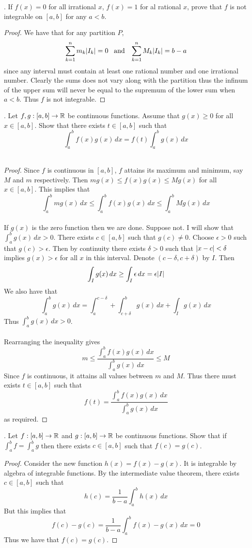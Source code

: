 \documentclass[a4paper]{article}
\begin{document}
\begin{qtn}{}{}
\thetcbcounter.\;\; If $f(x)=0$ for all irrational $x$, $f(x)=1$ for al rational $x$, prove that $f$ is not integrable on $[a,b]$ for any $a<b$. \tcbline
\begin{proof}
We have that for any partition $P$, $$\sum_{k=1}^nm_k\abs{I_k}=0\;\;\;\text{and}\;\;\;\sum_{k=1}^nM_k\abs{I_k}=b-a$$ since any interval must contain at least one rational number and one irrational number. Clearly the sums does not vary along with the partition thus the infinum of the upper sum will never be equal to the supremum of the lower sum when $a<b$. Thus $f$ is not integrable. 
\end{proof}
\end{qtn}

\begin{qtn}{}{}
\thetcbcounter.\;\; Let $f,g:[a,b]\to\mathbb{R}$ be continuous functions. Assume that $g(x)\geq 0$ for all $x\in[a,b]$. Show that there exists $t\in[a,b]$ such that $$\int_a^bf(x)g(x)\,dx=f(t)\int_a^bg(x)\,dx$$ \\\hspace*{\fill}\cite{R0002}\tcbline
\begin{proof}
Since $f$ is continuous in $[a,b]$, $f$ attains its maximum and minimum, say $M$ and $m$ respectively. Then $mg(x)\leq f(x)g(x)\leq Mg(x)$ for all $x\in[a,b]$. This implies that $$\int_a^bmg(x)\,dx\leq\int_a^bf(x)g(x)\,dx\leq\int_a^bMg(x)\,dx$$~\\
If $g(x)$ is the zero function then we are done. Suppose not. I will show that $\int_a^bg(x)\,dx>0$. There exists $c\in[a,b]$ such that $g(c)\neq 0$. Choose $\epsilon>0$ such that $g(c)>\epsilon$. Then by continuity there exists $\delta>0$ such that $\abs{x-c}<\delta$ implies $g(x)>\epsilon$ for all $x$ in this interval. Denote $(c-\delta,c+\delta)$ by $I$. Then $$\int_Ig(x)\,dx\geq\int_I\epsilon\,dx=\epsilon\abs{I}$$ We also have that $$\int_a^bg(x)\,dx=\int_a^{c-\delta}+\int_{c+\delta}^bg(x)\,dx+\int_Ig(x)\,dx$$ Thus $\int_a^bg(x)\,dx>0$. \\~\\
Rearranging the inequality gives $$m\leq\frac{\int_a^bf(x)g(x)\,dx}{\int_a^bg(x)\,dx}\leq M$$ Since $f$ is continuous, it attains all values between $m$ and $M$. Thus there must exists $t\in[a,b]$ such that $$f(t)=\frac{\int_a^bf(x)g(x)\,dx}{\int_a^bg(x)\,dx}$$ as required. 
\end{proof}
\end{qtn}

\begin{qtn}{}{}
\thetcbcounter.\;\; Let $f:[a,b]\to\mathbb{R}$ and $g:[a,b]\to\mathbb{R}$ be continuous functions. Show that if $\int_a^bf=\int_a^bg$ then there exists $c\in[a,b]$ such that $f(c)=g(c)$. \tcbline
\begin{proof}
Consider the new function $h(x)=f(x)-g(x)$. It is integrable by algebra of integrable functions. By the intermediate value theorem, there exists $c\in[a,b]$ such that $$h(c)=\frac{1}{b-a}\int_a^bh(x)\,dx$$ But this implies that $$f(c)-g(c)=\frac{1}{b-a}\int_a^bf(x)-g(x)\,dx=0$$ Thus we have that $f(c)=g(c)$. 
\end{proof}
\end{qtn}
\end{document}
